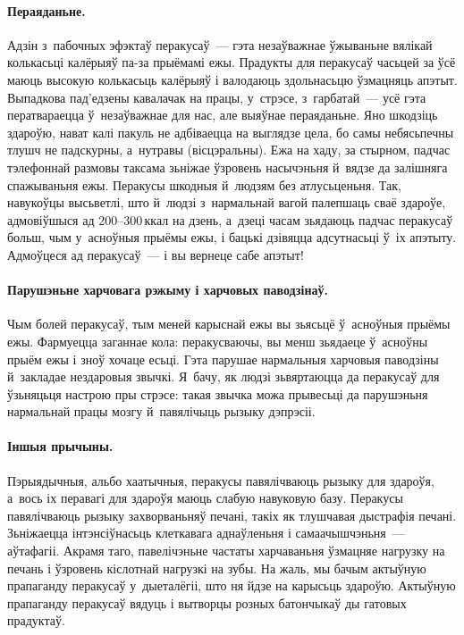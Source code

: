 \paragraph{Пераяданьне.}
Адзін з~пабочных эфэктаў перакусаў~--- гэта незаўважнае ўжываньне вялікай колькасьці калёрыяў па-за прыёмамі ежы. Прадукты для перакусаў часьцей за ўсё маюць высокую колькасьць калёрыяў і валодаюць здольнасьцю ўзмацняць апэтыт. Выпадкова пад'едзены кавалачак на працы, у~стрэсе, з~гарбатай~--- усё гэта ператвараецца ў~незаўважнае для нас, але выяўнае пераяданьне. Яно шкодзіць здароўю, нават калі пакуль не адбіваецца на выглядзе цела, бо самы небясьпечны тлушч не падскурны, а~нутравы (вісцэральны). Ежа на хаду, за стырном, падчас тэлефоннай размовы таксама зьніжае ўзровень насычэньня й~вядзе да залішняга спажываньня ежы. Перакусы шкодныя й~людзям без атлусьценьня. Так, навукоўцы высьветлі, што й~людзі з~нармальнай вагой палепшаць сваё здароўе, адмовіўшыся ад 200--300\,ккал на дзень, а~дзеці часам зьядаюць падчас перакусаў больш, чым у~асноўныя прыёмы ежы, і бацькі дзівяцца адсутнасьці ў~іх апэтыту. Адмоўцеся ад перакусаў~--- і вы вернеце сабе апэтыт!

\paragraph{Парушэньне харчовага рэжыму і харчовых паводзінаў.}
Чым болей перакусаў, тым меней карыснай ежы вы зьясьцё ў~асноўныя прыёмы ежы. Фармуецца заганнае кола: перакусваючы, вы менш зьядаеце ў~асноўны прыём ежы і зноў хочаце есьці. Гэта парушае нармальныя харчовыя паводзіны й~закладае нездаровыя звычкі. Я~бачу, як людзі зьвяртаюцца да перакусаў для ўзьняцьця настрою пры стрэсе: такая звычка можа прывесьці да парушэньня нармальнай працы мозгу й~павялічыць рызыку дэпрэсіі.


\paragraph{Іншыя прычыны.}
Пэрыядычныя, альбо хаатычныя, перакусы павялічваюць рызыку для здароўя, а~вось іх перавагі для здароўя маюць слабую навуковую базу. Перакусы павялічваюць рызыку захворваньняў печані, такіх як тлушчавая дыстрафія печані. Зьніжаецца інтэнсіўнасьць клеткавага аднаўленьня і самаачышчэньня~--- аўтафагіі. Акрамя таго, павелічэньне частаты харчаваньня ўзмацняе нагрузку на печань і ўзровень кіслотнай нагрузкі на зубы. На жаль, мы бачым актыўную прапаганду перакусаў у~дыеталёгіі, што ня йдзе на карысьць здароўю. Актыўную прапаганду перакусаў вядуць і вытворцы розных батончыкаў ды гатовых прадуктаў.

